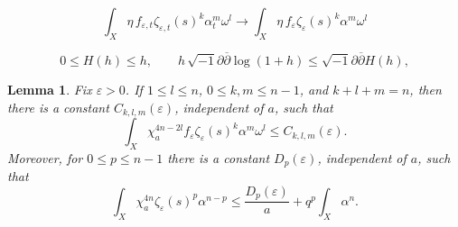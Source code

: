 \documentclass[10pt,a4paper]{amsart}
\newtheorem{lemma}{Lemma}
\renewcommand{\d}{\partial}
\newcommand{\ddbar}{\sqrt{-1}\d\overline{\d}}
\newcommand{\vep}{\varepsilon}
\begin{document}
\begin{equation}\label{eq:BT-convention}
\int_X \eta\, f_{\vep,t}\zeta_{\vep,t}(s)^k\alpha_t^m\omega^l
\longrightarrow
\int_X \eta\, f_\vep\zeta_\vep(s)^k\alpha^m\omega^l
\end{equation}

\begin{equation}\label{ineq:propsofHep}
        0\leq H(h)\leq h,
        \qquad
        h\,\ddbar\log(1+h)\leq\ddbar H(h),
\end{equation}

\begin{lemma}\label{lem:mixedterms}
Fix $\vep>0$.  If $1\leq l\leq n$, $0\leq k,m\leq n-1$, and $k+l+m=n$, then there is a constant $C_{k,l,m}(\vep)$, independent of $a$, such that
\begin{equation}\label{ineq:mixedtermsineqone}
\int_X\chi_a^{4n-2l}f_\vep\zeta_\vep(s)^k\alpha^m\omega^l
\leq C_{k,l,m}(\vep).
\end{equation}
Moreover, for $0\leq p\leq n-1$ there is a constant $D_p(\vep)$, independent of $a$, such that
\begin{equation}\label{ineq:mixedtermsineqtwo}
\int_X\chi_a^{4n}\zeta_\vep(s)^p\alpha^{n-p}
\leq \frac{D_p(\vep)}{a}+q^p\int_X\alpha^n .
\end{equation}
\end{lemma}
\end{document}
